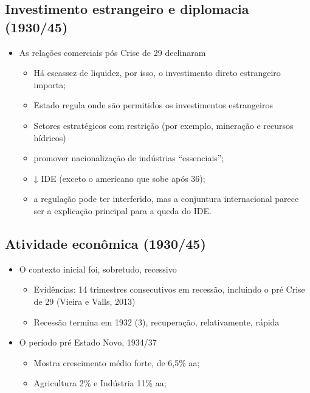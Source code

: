 \documentclass[a4paper,12pt]{article}[abntex2]
\begin{document}
\subsection{Investimento estrangeiro e diplomacia (1930/45)}
\begin{itemize}
    \item As relações comerciais pós Crise de 29
declinaram
\begin{itemize}
    \item Há escassez de liquidez, por isso, o investimento direto estrangeiro importa;
\item Estado regula onde são permitidos os investimentos estrangeiros
\item Setores estratégicos com restrição (por exemplo, mineração e recursos hídricos)
\item promover nacionalização de indústrias “essenciais”;
\item ↓ IDE (exceto o americano que sobe após 36);
\item a regulação pode ter interferido, mas a conjuntura internacional parece ser a explicação principal para a queda do IDE.
\end{itemize}
\end{itemize}

\subsection{Atividade econômica (1930/45)}
\begin{itemize}
    \item O contexto inicial foi, sobretudo, recessivo
    \begin{itemize}
        \item Evidências: 14 trimestres consecutivos em recessão, incluindo o pré Crise de 29 (Vieira e Valls, 2013)
        \item Recessão termina em 1932 (3), recuperação, relativamente, rápida
    \end{itemize}
    \item O período pré Estado Novo, 1934/37 
    \begin{itemize}
        \item Mostra crescimento médio forte, de 6,5\% aa;
        \item Agricultura 2\% e Indústria 11\% aa;
    \end{itemize}
\end{itemize}
\end{document}
